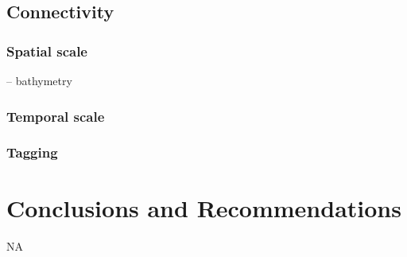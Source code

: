 \documentclass[letterpaper,portrait,11pt]{scrartcl}
\numberwithin{equation}{section}		%
\numberwithin{figure}{section}		%
\numberwithin{table}{section}				%
\begin{document}
\subsection{Connectivity}

\subsubsection{Spatial scale}

-- bathymetry

\subsubsection{Temporal scale}


\subsubsection{Tagging}



\section{Conclusions and Recommendations}

NA




\clearpage






\clearpage \newpage
\end{document}
